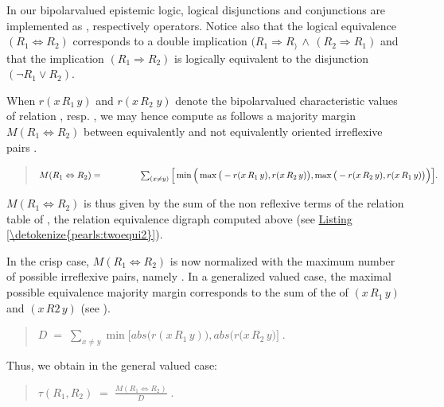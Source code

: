 \documentclass[a4paper,12pt,english]{sphinxhowto}
\begin{document}
\sphinxAtStartPar
In our bipolar\sphinxhyphen{}valued epistemic logic, logical disjunctions and conjunctions are implemented as , respectively  operators. Notice also that the logical equivalence \((R_1 \Leftrightarrow R_2)\) corresponds to a double implication \((R_1 \Rightarrow R_)\, \wedge \, (R_2 \Rightarrow  R_1)\) and that the implication \((R_1 \Rightarrow R_2)\) is logically equivalent to the disjunction \((\neg R_1 \vee R_2)\).

\sphinxAtStartPar
When \(r(x\,R_1\, y)\) and \(r(x\,R_2\; y)\) denote the bipolar\sphinxhyphen{}valued characteristic values of relation , resp. , we may hence compute as follows a majority margin \(M(R_1 \Leftrightarrow R_2)\) between equivalently and not equivalently oriented irreflexive pairs .
\begin{quote}

\sphinxAtStartPar
\(M(R_1 \Leftrightarrow R_2) =\\ \quad \quad \quad \quad \sum_{(x \neq y)} \Big[ \min \Big( \max \big( -r(x \,R_1\, y), r(x \,R_2\, y)\big), \max \big( -r(x \,R_2\, y), r(x \,R_1\, y)\big) \Big) \Big].\)
\end{quote}

\sphinxAtStartPar
\(M(R_1 \Leftrightarrow R_2)\) is thus given by the sum of the non reflexive terms of the relation table of , the relation equivalence digraph computed above (see \hyperref[\detokenize{pearls:twoequi2}]{Listing \ref{\detokenize{pearls:twoequi2}}}).

\sphinxAtStartPar
In the crisp case, \(M(R_1 \Leftrightarrow R_2)\)  is now normalized with the maximum number of possible irreflexive pairs, namely . In a generalized \sphinxhyphen{}valued case, the maximal possible equivalence majority margin  corresponds to the sum  of the  of \((x \,R_1\, y)\) and \((x \,R2\, y)\) (see ).
\begin{quote}

\sphinxAtStartPar
\(D \;=\; \sum_{x \neq y} \min \Big[ abs\big(r(x \,R_1\, y) \big), abs \big( r(x \,R_2\, y \big)  \Big]\;.\)
\end{quote}

\sphinxAtStartPar
Thus, we obtain in the general  \sphinxhyphen{}valued case:
\begin{quote}

\sphinxAtStartPar
\(\tau(R_1,R_2) \;=\; \frac{M(R_1 \Leftrightarrow R_2)}{D}\;.\)
\end{quote}
\end{document}
